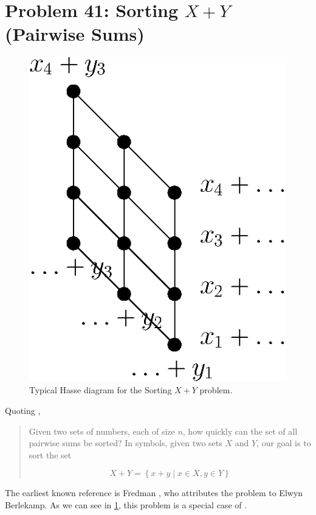 

\section{Problem 41: Sorting $X + Y$ (Pairwise Sums)}

\begin{figure}
	\centering
	\includegraphics[height=0.2\textheight]{fig/open/x+y}
	\caption{Typical Hasse diagram for the Sorting $X + Y$ problem.}
	\label{fig:open:xy}
\end{figure}

Quoting \cite{orourke:2012:sortxy},

\begin{quotation}
Given two sets of numbers, each of size $n$, how quickly can the set of all pairwise sums be sorted? In symbols, given two sets $X$ and $Y$, our goal is to sort the set

$$ X + Y = \left\{{x + y \mid x \in X, y \in Y }\right\} $$

\end{quotation}

The earliest known reference is Fredman \cite{fredman1976good}, who attributes the problem to Elwyn Berlekamp. As we can see in \ref{fig:open:xy}, this problem is a special case of .

